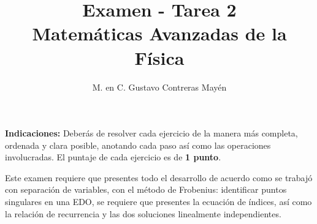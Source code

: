
\usepackage{apacite}
\title{Examen - Tarea 2 \\[0.3em]  \large{Matemáticas Avanzadas de la Física}\vspace{-3ex}}
\author{M. en C. Gustavo Contreras Mayén}
\date{ }

\vspace{-4cm}
\maketitle
\fontsize{14}{14}\selectfont

\textbf{Indicaciones: } Deberás de resolver cada ejercicio de la manera más completa, ordenada y clara posible, anotando cada paso así como las operaciones involucradas. El puntaje de cada ejercicio es de \textbf{1 punto}.
\par
Este examen requiere que presentes todo el desarrollo de acuerdo como se trabajó con separación de variables, con el método de Frobenius: identificar puntos singulares en una EDO, se requiere que presentes la ecuación de índices, así como la relación de recurrencia y las dos soluciones linealmente independientes.

